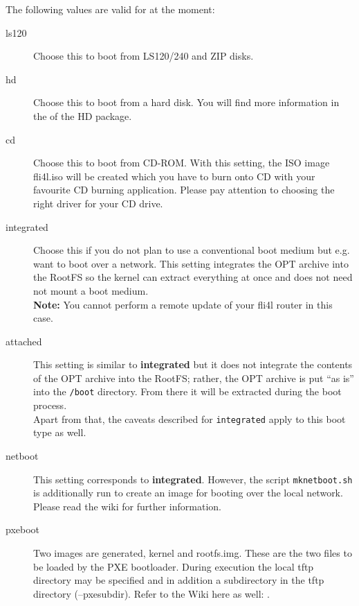 \begin{description}
  The following values are valid for  at the moment:

  \begin{description}
  \item[ls120] Choose this to boot from LS120/240 and ZIP disks.
  \item[hd] Choose this to boot from a hard disk. You will find more information in the
     of the HD package.
  \item[cd] Choose this to boot from CD-ROM. With this setting, the ISO image fli4l.iso will be created which
    you have to burn onto CD with your favourite CD burning application.
    Please pay attention to choosing the right driver for your CD drive.
  \item[integrated] Choose this if you do not plan to use a conventional boot
    medium but e.g. want to boot over a network. This setting integrates the
    OPT archive into the RootFS so the kernel can extract everything at once
    and does not need not mount a boot medium.\\
    \textbf{Note: } You cannot perform a remote update of your fli4l router in
    this case.
  \item[attached]
    This setting is similar to \textbf{integrated} but it does not integrate the
    contents of the OPT archive into the RootFS; rather, the OPT archive is
    put ``as is'' into the \texttt{/boot} directory. From there it will be
    extracted during the boot process.\\
    Apart from that, the caveats described for \texttt{integrated} apply to this
    boot type as well.
  \item[netboot]
    This setting corresponds to \textbf{integrated}. However, the script
    \texttt{mknetboot.sh} is additionally run to create an image for booting
    over the local network. Please read the wiki
    for further information.\\
  \item[pxeboot]
    Two images are generated, kernel and rootfs.img. These are the two files to be loaded
    by the PXE bootloader. During execution the local tftp directory may be specified and
    in addition a subdirectory in the tftp directory (--pxesubdir).
    Refer to the Wiki here as well:
    .
  \end{description}


\end{description}
